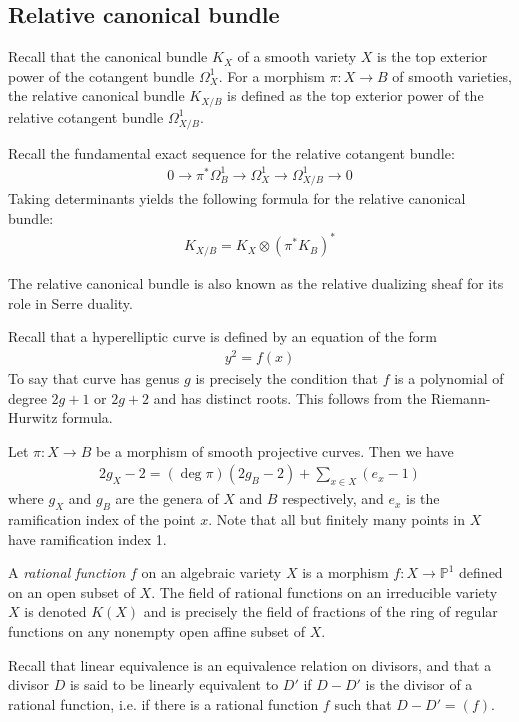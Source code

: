 \documentclass[12pt]{article}
\begin{document}
\subsection{Relative canonical bundle}
Recall that the canonical bundle $K_X$ of a smooth variety $X$ is the top exterior power of the cotangent bundle $\Omega^1_X$. For a morphism $\pi:X\to B$ of smooth varieties, the relative canonical bundle $K_{X/B}$ is defined as the top exterior power of the relative cotangent bundle $\Omega^1_{X/B}$. 

Recall the fundamental exact sequence for the relative cotangent bundle: \begin{align*}
    0 \to \pi^*\Omega^1_B \to \Omega^1_X \to \Omega^1_{X/B} \to 0
\end{align*} Taking determinants yields the following formula for the relative canonical bundle: \begin{align*}
    K_{X/B} = K_X \otimes (\pi^*K_B)^*
\end{align*} 

\begin{remark}
    The relative canonical bundle is also known as the relative dualizing sheaf for its role in Serre duality.
\end{remark}

\begin{example}
\label{ex:hyperelliptic-curves}
    Recall that a hyperelliptic curve is defined by an equation of the form \begin{align*}
        y^2 = f(x)
        \end{align*} To say that curve has genus $g$ is precisely the condition that $f$ is a polynomial of degree $2g+1$ or $2g+2$ and has distinct roots. This follows from the Riemann-Hurwitz formula.
\end{example}

\begin{theorem} Let $\pi:X\to B$ be a morphism of smooth projective curves. Then we have \begin{align*}
        2g_X - 2 = (\deg \pi )(2g_B - 2) + \sum_{x\in X} (e_x - 1)
    \end{align*} where $g_X$ and $g_B$ are the genera of $X$ and $B$ respectively, and $e_x$ is the ramification index of the point $x$. Note that all but finitely many points in $X$ have ramification index 1. 
\end{theorem}

\begin{definition}
    A \emph{rational function} $f$ on an algebraic variety $X$ is a morphism $f:X\to \mathbb{P}^1$ defined on an open subset of $X$. The field of rational functions on an irreducible variety $X$ is denoted $K(X)$ and is precisely the field of fractions of the ring of regular functions on any nonempty open affine subset of $X$.
    
    Recall that linear equivalence is an equivalence relation on divisors, and that a divisor $D$ is said to be linearly equivalent to $D'$ if $D-D'$ is the divisor of a rational function, i.e. if there is a rational function $f$ such that $D-D' = (f)$.
\end{definition}
\end{document}
